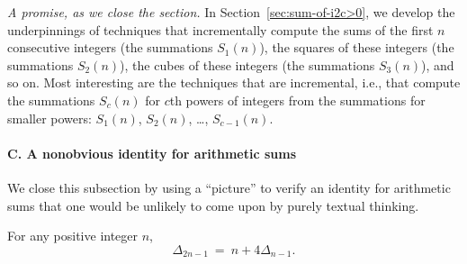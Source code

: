 %

\bigskip

{\it A promise, as we close the section.}
%
In Section~\ref{sec:sum-of-i2c>0}, we develop the underpinnings of
techniques that incrementally compute the sums of the first $n$
consecutive integers (the summations $S_1(n)$), the squares of these
integers (the summations $S_2(n)$), the cubes of these integers (the
summations $S_3(n)$), and so on.  Most interesting are the
techniques that are incremental, i.e., that compute the summations
$S_c(n)$ for $c$th powers of integers from the summations for
smaller powers: $S_1(n)$, $S_2(n)$, \ldots, $S_{c-1}(n)$.

\bigskip

\paragraph{\small\sf C. A nonobvious identity for arithmetic sums}

We close this subsection by using a ``picture'' to verify an identity for
arithmetic sums that one would be unlikely to come upon by purely
textual thinking.

\begin{prop} 
\label{thm:an-arithmetic-identity}
For any positive integer $n$,
\[ \Delta_{2n-1} \ = \ n + 4 \Delta_{n-1}. \]
\end{prop} 

